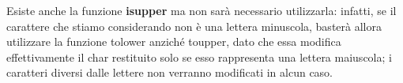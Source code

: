 Esiste anche la funzione \textbf{isupper} ma non sarà necessario utilizzarla: infatti, se il carattere che stiamo considerando non è una lettera minuscola, basterà allora utilizzare la funzione tolower anziché toupper, dato che essa modifica effettivamente il char restituito solo se esso rappresenta una lettera maiuscola; i caratteri diversi dalle lettere non verranno modificati in alcun caso.
\newline\newline
\colorbox{white}{}
\begin{comment}
   \begin{lstlisting}[language=C++]
#include <cctype>

void aggiusta(int N, char S[]){
    for(int i = 0; i < N; i++)
        S[i] = islower(S[i]) ? toupper(S[i]) : tolower(S[i]);
}
    \end{lstlisting}
\end{comment}